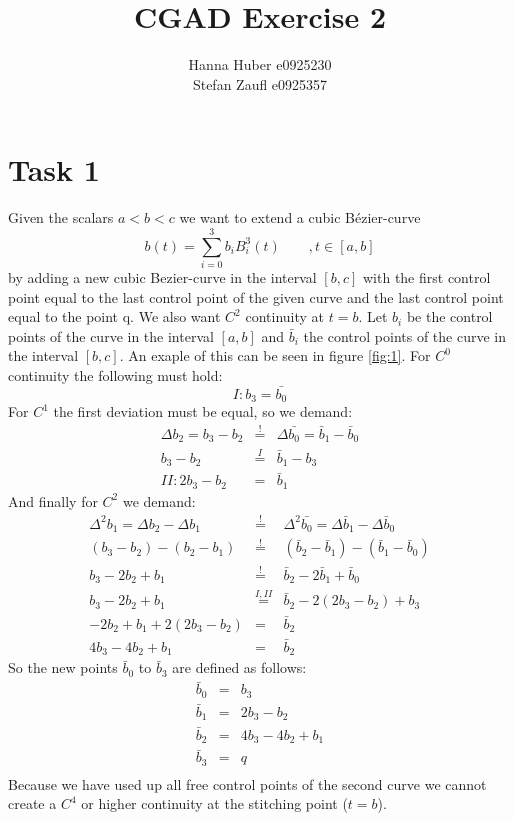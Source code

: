 \documentclass[12pt,a4paper]{article}
\title{CGAD Exercise 2}
\author{Hanna Huber e0925230\\Stefan Zaufl e0925357}
\begin{document}
\maketitle
\section{Task 1}
Given the scalars $a < b < c$ we want to extend a cubic Bézier-curve
\[ b(t) = \sum^{3}_{i=0}{b_iB^3_i(t)}\qquad ,t\in[a,b]\]
by adding a new cubic Bezier-curve in the interval $[b,c]$ with the first control point equal to the last control point of the given curve and the last control point equal to the point q. We also want $C^2$ continuity at $t=b$. Let $b_i$ be the control points of the curve in the interval $[a,b]$ and $\bar{b}_i$ the control points of the curve in the interval $[b,c]$. An exaple of this can be seen in figure \ref{fig:1}. For $C^0$ continuity the following must hold:
\[ I: b_3 = \bar{b_0}\]
For $C^1$ the first deviation must be equal, so we demand:
\begin{eqnarray*}
\Delta b_2 = b_3 - b_2 & \overset{!}{=} & \Delta \bar{b_0} = \bar{b}_1 - \bar{b}_0 \\
b_3 - b_2 & \overset{I}{=} & \bar{b}_1 - b_3 \\
II: 2b_3 - b_2 & = & \bar{b}_1
\end{eqnarray*}
And finally for $C^2$ we demand:
\begin{eqnarray*}
\Delta^2 b_1 = \Delta b_2 - \Delta b_1 & \overset{!}{=} & \Delta^2 \bar{b_0} = \Delta \bar{b}_1 - \Delta \bar{b}_0 \\
(b_3 - b_2) - (b_2 - b_1) & \overset{!}{=} & (\bar{b}_2 - \bar{b}_1) - (\bar{b}_1 - \bar{b}_0) \\
b_3 - 2b_2 + b_1 & \overset{!}{=} & \bar{b}_2 - 2\bar{b}_1 + \bar{b}_0 \\
b_3 - 2b_2 + b_1 & \overset{I,II}{=} & \bar{b}_2 - 2(2b_3 - b_2) + b_3 \\
-2b_2 + b_1 + 2(2b_3 - b_2) & = & \bar{b}_2 \\
4b_3 - 4b_2 + b_1 & = & \bar{b}_2
\end{eqnarray*}
So the new points $\bar{b}_0$ to $\bar{b}_3$ are defined as follows:
\begin{eqnarray*}
\bar{b}_0 & = & b_3 \\
\bar{b}_1 & = & 2b_3 - b_2 \\
\bar{b}_2 & = & 4b_3 - 4b_2 + b_1 \\
\bar{b}_3 & = & q \\
\end{eqnarray*}
Because we have used up all free control points of the second curve we cannot create a $C^4$ or higher continuity at the stitching point ($t=b$).
\end{document}
